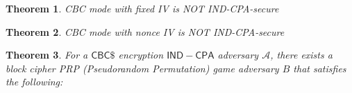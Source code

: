 \documentclass[12pt,openany]{book}
\newtheorem{theorem}{Theorem}[chapter]
\theoremstyle{definition}
\newcommand{\dollar}{\$}
\newcommand{\A}{\mathcal{A}}
\newcommand{\IND}{\mathsf{IND}}
\newcommand{\CPA}{\mathsf{CPA}}
\newcommand{\CBC}{\mathsf{CBC}}
\begin{document}
	\begin{tcolorbox}[colback=white,colframe=thmcolor, title={\color{white}\bf }]
		\begin{theorem}
			CBC mode with fixed IV is NOT IND-CPA-secure
		\end{theorem}
	\end{tcolorbox}

	\begin{tcolorbox}[colback=white,colframe=thmcolor, title={\color{white}\bf }]
		\begin{theorem}
			CBC mode with nonce IV is NOT IND-CPA-secure
		\end{theorem}
	\end{tcolorbox}

	\newpage
	\begin{tcolorbox}[colback=white,colframe=thmcolor, title={\color{white}\bf }]
		\begin{theorem}
			For a $\CBC\dollar$ encryption $\IND-\CPA$ adversary $\A$, there exists a block cipher PRP (Pseudorandom Permutation) game adversary $B$ that satisfies the following:
		\end{theorem}
	\end{tcolorbox}
\end{document}

